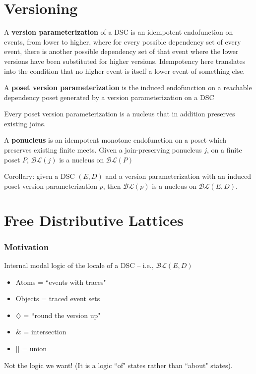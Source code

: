 \documentclass{beamer}
\newcommand{\BLc}{\mathcal{BL}}
\newcommand{\Dia}{\diamondsuit}
\begin{document}
\section{Versioning}
\begin{frame}
\begin{definition}
A \textbf{version parameterization} of a DSC is an idempotent endofunction on events, from lower to higher, where for every possible dependency set of every event, there is another possible dependency set of that event where the lower versions have been substituted for higher versions. Idempotency here translates into the condition that no higher event is itself a lower event of something else.

A \textbf{poset version parameterization} is the induced endofunction on a reachable dependency poset generated by a version parameterization on a DSC
\end{definition}

\end{frame}

\begin{frame}
\begin{lemma}
Every poset version parameterization is a nucleus that in addition preserves existing joins.
\end{lemma}

\begin{theorem}
A \textbf{ponucleus} is an idempotent monotone endofunction on a poset which preserves existing finite meets.
Given a join-preserving ponucleus \(j\), on a finite poset \(P\),  \(\BLc(j)\) is a nucleus on \(\BLc(P)\)
\end{theorem}

Corollary: given a DSC \((E,D)\) and a version parameterization with an induced poset version parameterization \(p\), then \(\BLc(p)\) is a nucleus on \(\BLc(E,D)\).
\end{frame}

\section{Free Distributive Lattices}
\begin{frame}
\frametitle{Motivation}
Internal modal logic of the locale of a DSC  -- i.e., \(\BLc(E,D)\)
\begin{itemize}
\item Atoms = ``events with traces"
\item Objects = traced event sets
\item \(\Dia\) = ``round the version up"
\item \(\&\) = intersection
\item \(||\) = union
\end{itemize}

Not the logic we want! (It is a logic ``of" states rather than ``about" states).
\end{frame}
\end{document}
